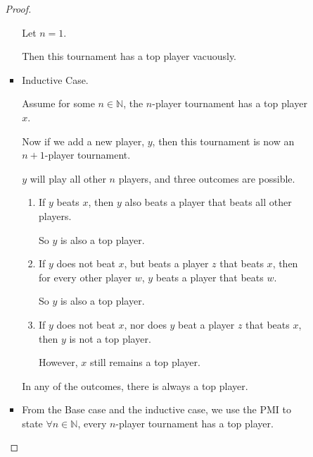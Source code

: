 \documentclass[12pt,letterpaper]{article}
\begin{document}
\begin{enumerate}
\begin{enumerate}
\begin{enumerate}
\begin{proof}
\begin{itemize}
                    Let $n = 1$.

                    Then this tournament has a top player vacuously.
                  \item Inductive Case.

                    Assume for some $n \in \mathbb{N}$,
                    the $n$-player tournament has a top player $x$.

                    Now if we add a new player, $y$,
                    then this tournament is now an $n + 1$-player tournament.

                    $y$ will play all other $n$ players,
                    and three outcomes are possible.

                    \begin{enumerate}
                      \item
                        If $y$ beats $x$,
                        then $y$ also beats a player that beats all other players.

                        So $y$ is also a top player.
                      \item
                        If $y$ does not beat $x$, but beats a player $z$ that beats $x$,
                        then for every other player $w$, $y$ beats a player that beats $w$.

                        So $y$ is also a top player.
                      \item
                        If $y$ does not beat $x$, nor does $y$ beat a player $z$ that beats $x$,
                        then $y$ is not a top player.

                        However, $x$ still remains a top player.
                    \end{enumerate}

                    In any of the outcomes, there is always a top player.

                  \item
                    From the Base case and the inductive case,
                    we use the PMI to state $\forall n \in \mathbb{N}$,
                    every $n$-player tournament has a top player.
                \end{itemize}
              \end{proof}
          \end{enumerate}
      \end{enumerate}
  \end{enumerate}
\end{document}
